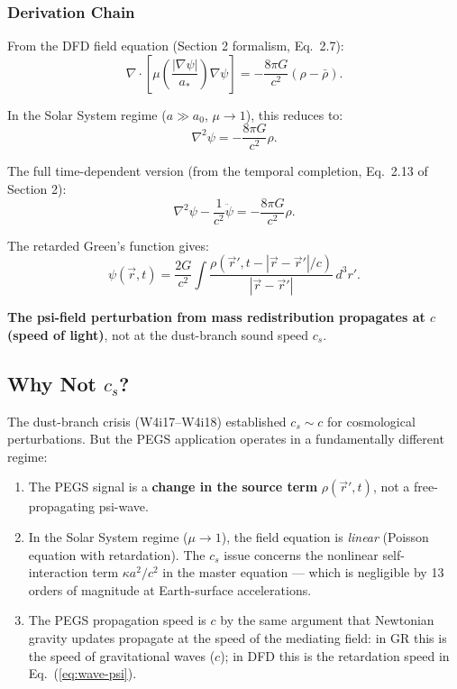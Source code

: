 \documentclass[11pt]{article}
\theoremstyle{definition}
\theoremstyle{remark}
\begin{document}
\subsubsection{Derivation Chain}

From the DFD field equation (Section 2 formalism, Eq.~2.7):
\begin{equation}
  \nabla \cdot \left[\mu\!\left(\frac{|\nabla\psi|}{a_*}\right)
  \nabla\psi\right] = -\frac{8\pi G}{c^2}(\rho - \bar{\rho}).
\end{equation}

In the Solar System regime ($a \gg a_0$, $\mu \to 1$), this reduces to:
\begin{equation}
  \nabla^2\psi = -\frac{8\pi G}{c^2}\rho.
\end{equation}

The full time-dependent version (from the temporal completion,
Eq.~2.13 of Section 2):
\begin{equation}\label{eq:wave-psi}
  \nabla^2\psi - \frac{1}{c^2}\ddot{\psi} = -\frac{8\pi G}{c^2}\rho.
\end{equation}

The retarded Green's function gives:
\begin{equation}
  \psi(\vec{r}, t) = \frac{2G}{c^2} \int \frac{\rho(\vec{r}', t - |\vec{r} - \vec{r}'|/c)}
  {|\vec{r} - \vec{r}'|}\, d^3r'.
\end{equation}

\textbf{The psi-field perturbation from mass redistribution propagates at
$c$ (speed of light)}, not at the dust-branch sound speed $c_s$.

\subsection{Why Not $c_s$?}

The dust-branch crisis (W4i17--W4i18) established $c_s \sim c$ for
cosmological perturbations. But the PEGS application operates in a
fundamentally different regime:

\begin{enumerate}
  \item The PEGS signal is a \textbf{change in the source term} $\rho(\vec{r}', t)$,
    not a free-propagating psi-wave.
  \item In the Solar System regime ($\mu \to 1$), the field equation is
    \emph{linear} (Poisson equation with retardation). The $c_s$ issue
    concerns the nonlinear self-interaction term
    $\kappa a^2/c^2$ in the master equation --- which is negligible
    by 13 orders of magnitude at Earth-surface accelerations.
  \item The PEGS propagation speed is $c$ by the same argument that
    Newtonian gravity updates propagate at the speed of the mediating
    field: in GR this is the speed of gravitational waves ($c$);
    in DFD this is the retardation speed in Eq.~(\ref{eq:wave-psi}).
\end{enumerate}
\end{document}
